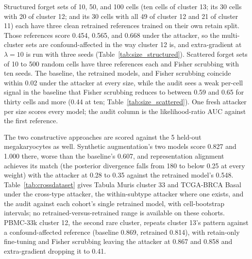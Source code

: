 \documentclass{article}
\begin{document}
Structured forget sets of 10, 50, and 100 cells (ten cells of cluster 13; its 30 cells with 20 of cluster 12; and its 30 cells with all 49 of cluster 12 and 21 of cluster 11) each have three clean retrained references trained on their own retain split. Those references score 0.454, 0.565, and 0.668 under the attacker, so the multi-cluster sets are confound-affected in the way cluster 12 is, and extra-gradient at $\lambda = 10$ is run with three seeds (Table~\ref{tab:size_structured}). Scattered forget sets of 10 to 500 random cells have three references each and Fisher scrubbing with ten seeds. The baseline, the retrained models, and Fisher scrubbing coincide within 0.02 under the attacker at every size, while the audit sees a weak per-cell signal in the baseline that Fisher scrubbing reduces to between 0.59 and 0.65 for thirty cells and more (0.44 at ten; Table~\ref{tab:size_scattered}). One fresh attacker per size scores every model; the audit column is the likelihood-ratio AUC against the first reference.

\begin{table}[h]
\centering
\caption{Structured forget sets with per-size retrained references. Generated from \texttt{size\_ablations\_v2.json}; the forget sets are those of \texttt{split\_structured\_n\{10,50,100\}.json} under \texttt{outputs/p4/extragradient\_size/splits}.}
\label{tab:size_structured}
\small
\resizebox{\textwidth}{!}{}
\end{table}

\begin{table}[h]
\centering
\caption{Scattered forget sets with per-size retrained references. Generated from \texttt{size\_ablations\_v2.json}.}
\label{tab:size_scattered}
\small
\resizebox{\textwidth}{!}{}
\end{table}

The two constructive approaches are scored against the 5 held-out megakaryocytes as well. Synthetic augmentation's two models score 0.827 and 1.000 there, worse than the baseline's 0.607, and representation alignment achieves its match (the posterior divergence falls from 180 to below 0.25 at every weight) with the attacker at 0.28 to 0.35 against the retrained model's 0.548. Table~\ref{tab:crossdataset} gives Tabula Muris cluster 33 and TCGA-BRCA Basal under the cross-type attacker, the within-subtype attacker where one exists, and the audit against each cohort's single retrained model, with cell-bootstrap intervals; no retrained-versus-retrained range is available on these cohorts. PBMC-33k cluster 12, the second rare cluster, repeats cluster 13's pattern against a confound-affected reference (baseline 0.869, retrained 0.814), with retain-only fine-tuning and Fisher scrubbing leaving the attacker at 0.867 and 0.858 and extra-gradient dropping it to 0.41.
\end{document}
